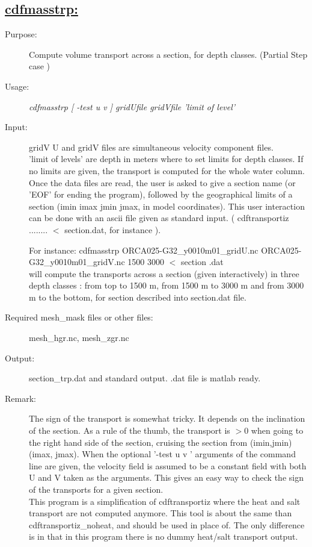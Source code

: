 \documentclass[a4paper,11pt]{article}
\begin{document}
\newpage
\subsection*{\underline{cdfmasstrp:}}
\begin{description}
\item[Purpose:] Compute volume transport across a section, for depth classes. (Partial Step case )
\item[Usage:] {\em cdfmasstrp [ -test u v ]  gridUfile gridVfile  'limit of level' }
\item[Input:]  gridV U and gridV files are simultaneous velocity component files. \\
'limit of levels' are depth in meters where to set limits for depth classes. If no limits are given, the transport is
computed for the whole water column. \\
Once the data files  are read, the user is asked to give a section name (or 'EOF' for ending the program), followed
by the geographical limits of a section (imin imax jmin jmax, in model coordinates). This user interaction can be done
with an ascii file given as standard input. ( cdftransportiz ........ $<$ section.dat, for instance ).

For instance: cdfmasstrp  ORCA025-G32\_y0010m01\_gridU.nc  ORCA025-G32\_y0010m01\_gridV.nc 
1500 3000 $<$ section .dat \\
will compute the transports across a section (given interactively) in three depth classes : from top to 1500 m, from 1500 m
to 3000 m and from 3000 m to the bottom, for section described into section.dat file.
\item[Required mesh\_mask files or other files:]   mesh\_hgr.nc, mesh\_zgr.nc
\item[Output:]section\_trp.dat and standard output. .dat file is matlab ready.
\item[Remark:] The sign of the transport is somewhat tricky. It depends on the inclination of the section. As a rule of 
the thumb, the transport is $>0$ when going to the right hand side of the section, cruising the section from (imin,jmin) 
(imax, jmax). When the optional '-test u v ' arguments of the command line are  given, the velocity field is assumed to 
be a constant field with both U and V taken as the arguments. This gives an easy way to check the sign of the transports for a given section.\\
This program is a simplification of cdftransportiz where the heat and salt transport are not computed anymore. This tool is about the same than
cdftransportiz\_noheat, and should be used in place of. The only difference is in that in this program there is no dummy heat/salt transport output.
\end{description}
\end{document}
